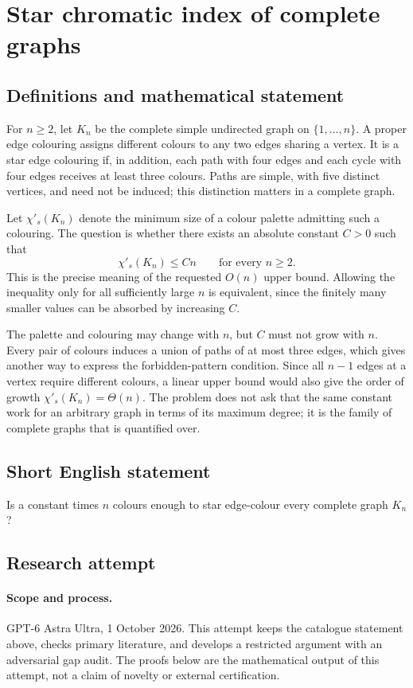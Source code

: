 \documentclass[11pt,a4paper]{article}
\begin{document}
\section*{Star chromatic index of complete graphs}\label{statement}

\subsection{Definitions and mathematical statement}
For $n\ge2$, let $K_n$ be the complete simple undirected graph on
$\{1,\ldots,n\}$. A proper edge colouring assigns different colours to
any two edges sharing a vertex. It is a star edge colouring if, in
addition, each path with four edges and each cycle with four edges
receives at least three colours. Paths are simple, with five distinct
vertices, and need not be induced; this distinction matters in a
complete graph.

Let $\chi'_s(K_n)$ denote the minimum size of a colour palette admitting
such a colouring. The question is whether there exists an absolute
constant $C>0$ such that
\[
 \chi'_s(K_n)\le Cn\qquad\text{for every }n\ge2.
\]
This is the precise meaning of the requested $O(n)$ upper bound.
Allowing the inequality only for all sufficiently large $n$ is equivalent,
since the finitely many smaller values can be absorbed by increasing $C$.

The palette and colouring may change with $n$, but $C$ must not grow
with $n$. Every pair of colours induces a union of paths of at most
three edges, which gives another way to express the forbidden-pattern
condition. Since all $n-1$ edges at a vertex require different colours,
a linear upper bound would also give the order of growth
$\chi'_s(K_n)=\Theta(n)$.
The problem does not ask that the same constant work for an arbitrary
graph in terms of its maximum degree; it is the family of complete
graphs that is quantified over.
\subsection{Short English statement}
Is a constant times $n$ colours enough to star edge-colour every complete graph $K_n$?
\subsection{Research attempt}
\paragraph{Scope and process.}
GPT-6 Astra Ultra, 1 October 2026. This attempt keeps the catalogue statement above, checks primary literature, and develops a restricted argument with an adversarial gap audit. The proofs below are the mathematical output of this attempt, not a claim of novelty or external certification.
\end{document}
